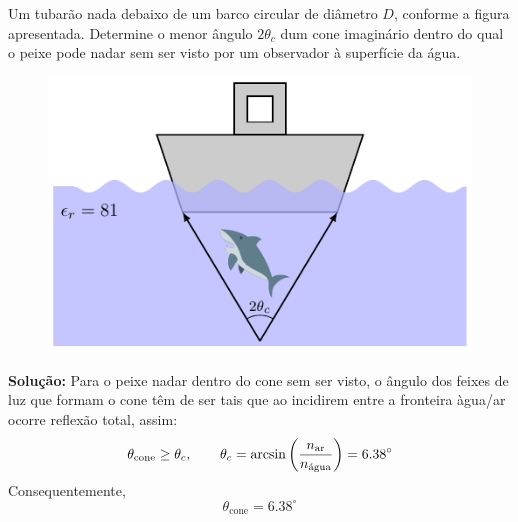 \begin{question}
    Um tubarão nada debaixo de um barco circular de diâmetro $D$, conforme a figura apresentada. Determine o menor ângulo $2\theta_c$ dum cone imaginário dentro do qual o peixe pode nadar sem ser visto por um observador à superfície da água.
    \begin{figure}[H]
        \centering
        \includegraphics[width=.6\textwidth,keepaspectratio]{img/1/Shark.pdf}
    \end{figure}

    \vspace{-1em}
    \questionSep
    \textbf{Solução:} Para o peixe nadar dentro do cone sem ser visto, o ângulo dos feixes de luz que formam o cone têm de ser tais que ao incidirem entre a fronteira àgua/ar ocorre reflexão total, assim:
    $$
    \theta_\text{cone} \ge \theta_c, 
    \qquad
    \theta_c = \arcsin\left( \frac{n_\text{ar}}{n_\text{água}} \right) = 6.38^{\circ}\\
    $$
    Consequentemente,
    $$
        \boxed{\theta_\text{cone} = 6.38^{\circ}}
    $$
\end{question}


